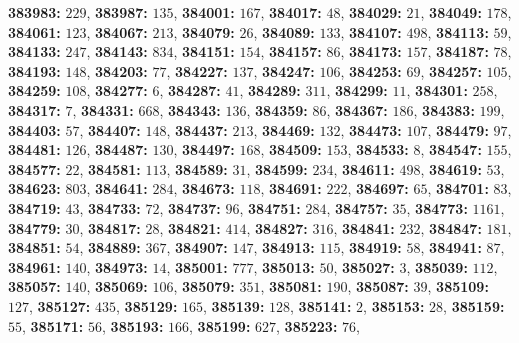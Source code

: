 \textsf{\bfseries 383983:} $229$, \textsf{\bfseries 383987:} $135$, \textsf{\bfseries 384001:} $167$, \textsf{\bfseries 384017:} $48$, \textsf{\bfseries 384029:} $21$, \textsf{\bfseries 384049:} $178$, \textsf{\bfseries 384061:} $123$, \textsf{\bfseries 384067:} $213$, \textsf{\bfseries 384079:} $26$, \textsf{\bfseries 384089:} $133$, \textsf{\bfseries 384107:} $498$, \textsf{\bfseries 384113:} $59$, \textsf{\bfseries 384133:} $247$, \textsf{\bfseries 384143:} $834$, \textsf{\bfseries 384151:} $154$, \textsf{\bfseries 384157:} $86$, \textsf{\bfseries 384173:} $157$, \textsf{\bfseries 384187:} $78$, \textsf{\bfseries 384193:} $148$, \textsf{\bfseries 384203:} $77$, \textsf{\bfseries 384227:} $137$, \textsf{\bfseries 384247:} $106$, \textsf{\bfseries 384253:} $69$, \textsf{\bfseries 384257:} $105$, \textsf{\bfseries 384259:} $108$, \textsf{\bfseries 384277:} $6$, \textsf{\bfseries 384287:} $41$, \textsf{\bfseries 384289:} $311$, \textsf{\bfseries 384299:} $11$, \textsf{\bfseries 384301:} $258$, \textsf{\bfseries 384317:} $7$, \textsf{\bfseries 384331:} $668$, \textsf{\bfseries 384343:} $136$, \textsf{\bfseries 384359:} $86$, \textsf{\bfseries 384367:} $186$, \textsf{\bfseries 384383:} $199$, \textsf{\bfseries 384403:} $57$, \textsf{\bfseries 384407:} $148$, \textsf{\bfseries 384437:} $213$, \textsf{\bfseries 384469:} $132$, \textsf{\bfseries 384473:} $107$, \textsf{\bfseries 384479:} $97$, \textsf{\bfseries 384481:} $126$, \textsf{\bfseries 384487:} $130$, \textsf{\bfseries 384497:} $168$, \textsf{\bfseries 384509:} $153$, \textsf{\bfseries 384533:} $8$, \textsf{\bfseries 384547:} $155$, \textsf{\bfseries 384577:} $22$, \textsf{\bfseries 384581:} $113$, \textsf{\bfseries 384589:} $31$, \textsf{\bfseries 384599:} $234$, \textsf{\bfseries 384611:} $498$, \textsf{\bfseries 384619:} $53$, \textsf{\bfseries 384623:} $803$, \textsf{\bfseries 384641:} $284$, \textsf{\bfseries 384673:} $118$, \textsf{\bfseries 384691:} $222$, \textsf{\bfseries 384697:} $65$, \textsf{\bfseries 384701:} $83$, \textsf{\bfseries 384719:} $43$, \textsf{\bfseries 384733:} $72$, \textsf{\bfseries 384737:} $96$, \textsf{\bfseries 384751:} $284$, \textsf{\bfseries 384757:} $35$, \textsf{\bfseries 384773:} $1161$, \textsf{\bfseries 384779:} $30$, \textsf{\bfseries 384817:} $28$, \textsf{\bfseries 384821:} $414$, \textsf{\bfseries 384827:} $316$, \textsf{\bfseries 384841:} $232$, \textsf{\bfseries 384847:} $181$, \textsf{\bfseries 384851:} $54$, \textsf{\bfseries 384889:} $367$, \textsf{\bfseries 384907:} $147$, \textsf{\bfseries 384913:} $115$, \textsf{\bfseries 384919:} $58$, \textsf{\bfseries 384941:} $87$, \textsf{\bfseries 384961:} $140$, \textsf{\bfseries 384973:} $14$, \textsf{\bfseries 385001:} $777$, \textsf{\bfseries 385013:} $50$, \textsf{\bfseries 385027:} $3$, \textsf{\bfseries 385039:} $112$, \textsf{\bfseries 385057:} $140$, \textsf{\bfseries 385069:} $106$, \textsf{\bfseries 385079:} $351$, \textsf{\bfseries 385081:} $190$, \textsf{\bfseries 385087:} $39$, \textsf{\bfseries 385109:} $127$, \textsf{\bfseries 385127:} $435$, \textsf{\bfseries 385129:} $165$, \textsf{\bfseries 385139:} $128$, \textsf{\bfseries 385141:} $2$, \textsf{\bfseries 385153:} $28$, \textsf{\bfseries 385159:} $55$, \textsf{\bfseries 385171:} $56$, \textsf{\bfseries 385193:} $166$, \textsf{\bfseries 385199:} $627$, \textsf{\bfseries 385223:} $76$, 
